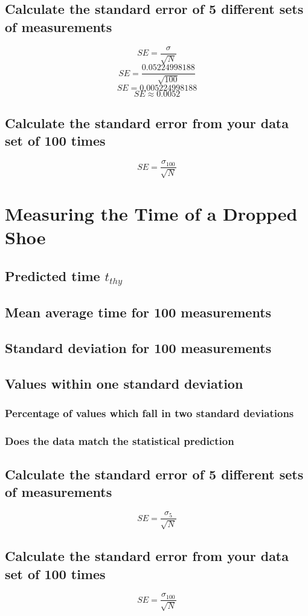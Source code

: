 \documentclass[11pt, letterpaper, includehead]{article}
\begin{document}
\subsection{Calculate the standard error of 5 different sets of measurements}


  $$SE = \frac{\sigma}{\sqrt{N}}$$
  $$SE = \frac{0.05224998188}{\sqrt{100}}$$
  $$SE = 0.005224998188$$
  $$SE \approx 0.0052$$

  \subsection{Calculate the standard error from your data set of 100 times}

  $$SE = \frac{\sigma_{100}}{\sqrt{N}}$$

  \section{Measuring the Time of a Dropped Shoe}

  \subsection{Predicted time $t_{thy}$} %

  \setcounter{subsection}{3} %
  \subsection{Mean average time for 100 measurements} %

  \subsection{Standard deviation for 100 measurements} %

  \subsection{Values within one standard deviation} %

  \subsubsection{Percentage of values which fall in two standard deviations}

  \subsubsection{Does the data match the statistical prediction}

  \subsection{Calculate the standard error of 5 different sets of measurements}

  $$SE = \frac{\sigma_{5}}{\sqrt{N}}$$


\subsection{Calculate the standard error from your data set of 100 times}


  $$SE = \frac{\sigma_{100}}{\sqrt{N}}$$
\end{document}
